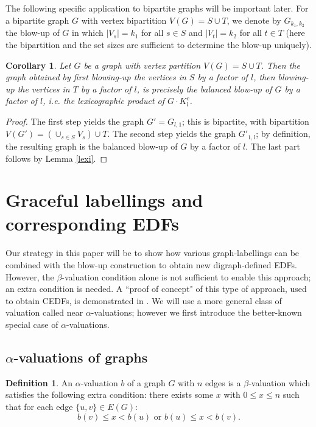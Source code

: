 \documentclass[12pt, a4paper]{article}
\newtheorem{corollary}[theorem]{Corollary}
\theoremstyle{definition}
\newtheorem{definition}[theorem]{Definition}
\begin{document}
The following specific application to bipartite graphs will be important later.  For a bipartite graph $G$ with vertex bipartition $V(G)=S \cup T$, we denote by $G_{k_1,k_2}$ the blow-up of $G$ in which $|V_s| = k_1$ for all $s\in S$ and $|V_t| = k_2$ for all $t\in T$ (here the bipartition and the set sizes are sufficient to determine the blow-up uniquely).  
\begin{corollary}\label{lexiblow}
Let $G$ be a graph with vertex partition $V(G)=S \cup T$.  Then the graph obtained by first blowing-up the vertices in $S$ by a factor of $l$, then blowing-up the vertices in $T$ by a factor of $l$, is precisely the balanced blow-up of $G$ by a factor of $l$,  i.e. the lexicographic product of $G \cdot K_l^c$.
\end{corollary}
\begin{proof}
The first step yields the graph $G'=G_{l,1}$; this is bipartite, with bipartition $V(G')=(\cup_{s \in S}V_s) \cup T$.  The second step yields the graph $G'_{1,l}$; by definition, the resulting graph is the balanced blow-up of $G$ by a factor of $l$. The last part follows by Lemma \ref{lexi}.
\end{proof}



\section{Graceful labellings and corresponding EDFs}

Our strategy in this paper will be to show how various graph-labellings can be combined with the blow-up construction to obtain new digraph-defined EDFs.  However, the $\beta$-valuation condition alone is not sufficient to enable this approach; an extra condition is needed.  A ``proof of concept" of this type of approach, used to obtain CEDFs, is demonstrated in \cite{PatStiCEDF}.  We will use a more general class of valuation called near $\alpha$-valuations; however we first introduce the better-known special case of $\alpha$-valuations.

\subsection{$\alpha$-valuations of graphs}

\begin{definition}
An $\alpha$-valuation $b$ of a graph $G$ with $n$ edges is a $\beta$‐valuation which satisfies the following extra condition:
there exists some $x$ with $0 \leq x \leq n$ such that for each edge $\{u,v\} \in E(G)$: 
\[b(v) \leq x < b(u) \text{ or } b(u) \leq x < b(v).\]
\end{definition}
\end{document}
